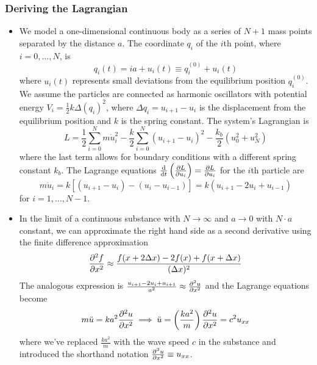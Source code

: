 \documentclass[11pt, a4paper]{article}
\begin{document}
\subsubsection{Deriving the Lagrangian}
\begin{itemize}
	\item We model a one-dimensional continuous body as a series of $ N + 1 $ mass points separated by the distance $ a $. The coordinate $ q_{i} $ of the $ i $th point, where $ i = 0, \ldots, N $, is
	\begin{equation*}
		q_{i}(t) = i a + u_{i}(t) \equiv q_{i}^{(0)} + u_{i}(t)
	\end{equation*}
	where $ u_{i}(t) $ represents small deviations from the equilibrium position $ q_{i}^{(0)}  $. We assume the particles are connected as harmonic oscillators with potential energy $ V_{i} = \frac{1}{2}k\Delta (q_{i})^{2} $, where $ \Delta q_{i} = u_{i+1} - u_{i}$ is the displacement from the equilibrium position and $ k $ is the spring constant. The system's Lagrangian is
	\begin{equation*}
		L = \frac{1}{2}\sum_{i=0}^{N} m \dot{u}_{i}^{2}  - \frac{k}{2}\sum_{i=0}^{N}(u_{i+1}-u_{i})^{2} -\frac{k_{b}}{2} (u_{0}^{2} + u_{N}^{2})
	\end{equation*}
	where the last term allows for boundary conditions with a different spring constant $ k_{b} $. The Lagrange equations $ \dv{}{t} \left(\pdv{L}{u_{i}}\right) = \pdv{L}{u_{i}}   $ for the $ i $th particle  are
	\begin{equation*}
		m\ddot{u}_{i} = k\left[(u_{i+1} - u_{i}) - (u_{i} - u_{i-1})\right] = k (u_{i+1} - 2u_{i} + u_{i-1})
	\end{equation*}
	for $ i = 1, \ldots, N-1 $.
	
	\item In the limit of a continuous substance with $ N \to \infty $ and $ a \to 0 $ with $ N\cdot a  $ constant, we can approximate the right hand side as a second derivative using the finite difference approximation
	\begin{equation*}
		\pdv[2]{f}{x} \approx \frac{f(x+2\Delta x) - 2f(x) + f(x + \Delta x)}{(\Delta x)^{2}} 
	\end{equation*}
	The analogous expression is $ \frac{u_{i+1} - 2u_{i} + u_{i+1}}{a^{2}} \approx \pdv[2]{u}{x} $ and the Lagrange equations become
	\begin{equation*}
		m \ddot{u} = ka^{2}\pdv[2]{u}{x} \implies \ddot{u} = \left(\frac{ka^{2}}{m} \right)\pdv[2]{u}{x} = c^{2} u_{xx}
	\end{equation*}
	where we've replaced $ \frac{ka^{2}}{m} $ with the wave speed $ c $ in the substance and introduced the shorthand notation $ \pdv[2]{u}{x} \equiv u_{xx} $.
	

\end{itemize}
\end{document}
